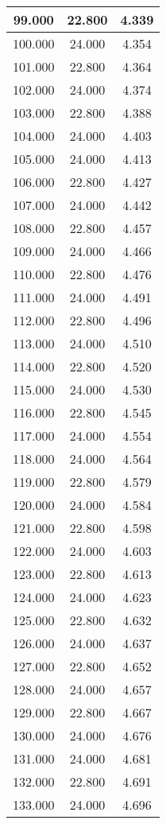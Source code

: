 \documentclass[11pt,a4paper]{jsarticle}
\begin{document}
\begin{center}
\begin{longtable}{|c|c|c|}
99.000	 & 22.800&  4.339 \\ \hline
100.000	 & 24.000&  4.354 \\ \hline
101.000	 & 22.800&  4.364 \\ \hline
102.000	 & 24.000&  4.374 \\ \hline
103.000	 & 22.800&  4.388 \\ \hline
104.000	 & 24.000&  4.403 \\ \hline
105.000	 & 24.000&  4.413 \\ \hline
106.000	 & 22.800&  4.427 \\ \hline
107.000	 & 24.000&  4.442 \\ \hline
108.000	 & 22.800&  4.457 \\ \hline
109.000	 & 24.000&  4.466 \\ \hline
110.000	 & 22.800&  4.476 \\ \hline
111.000	 & 24.000&  4.491 \\ \hline
112.000	 & 22.800&  4.496 \\ \hline
113.000	 & 24.000&  4.510 \\ \hline
114.000	 & 22.800&  4.520 \\ \hline
115.000	 & 24.000&  4.530 \\ \hline
116.000	 & 22.800&  4.545 \\ \hline
117.000	 & 24.000&  4.554 \\ \hline
118.000	 & 24.000&  4.564 \\ \hline
119.000	 & 22.800&  4.579 \\ \hline
120.000	 & 24.000&  4.584 \\ \hline
121.000	 & 22.800&  4.598 \\ \hline
122.000	 & 24.000&  4.603 \\ \hline
123.000	 & 22.800&  4.613 \\ \hline
124.000	 & 24.000&  4.623 \\ \hline
125.000	 & 22.800&  4.632 \\ \hline
126.000	 & 24.000&  4.637 \\ \hline
127.000	 & 22.800&  4.652 \\ \hline
128.000	 & 24.000&  4.657 \\ \hline
129.000	 & 22.800&  4.667 \\ \hline
130.000	 & 24.000&  4.676 \\ \hline
131.000	 & 24.000&  4.681 \\ \hline
132.000	 & 22.800&  4.691 \\ \hline
133.000	 & 24.000&  4.696 \\ \hline

\end{longtable}
\end{center}
\end{document}
